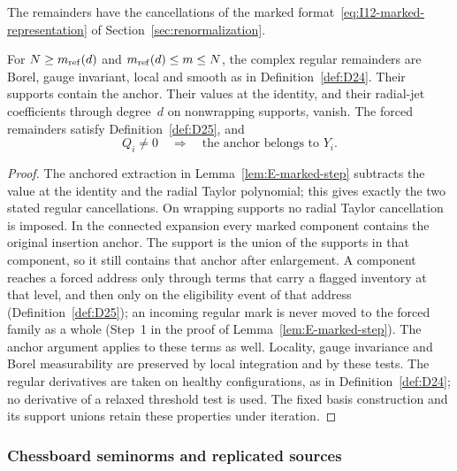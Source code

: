 The remainders have the cancellations of the marked format~\eqref{eq:I12-marked-representation} of Section~\ref{sec:renormalization}.
\begin{lemma}\label{lem:E2.2a}
For $N\ge m_{\mathrm{ref}}(d)$ and $m_{\mathrm{ref}}(d)\le m\le N$, the complex regular remainders are Borel, gauge invariant, local and smooth as in Definition~\ref{def:D24}. Their supports contain the anchor. Their values at the identity, and their radial-jet coefficients through degree~$d$ on nonwrapping supports, vanish. The forced remainders satisfy Definition~\ref{def:D25}, and
\begin{equation*}
Q_i\ne0\quad\Longrightarrow\quad\text{the anchor belongs to }Y_i.
\end{equation*}
\end{lemma}
\begin{proof}
The anchored extraction in Lemma~\ref{lem:E-marked-step} subtracts the value at the identity and the radial Taylor polynomial; this gives exactly the two stated regular cancellations. On wrapping supports no radial Taylor cancellation is imposed. In the connected expansion every marked component contains the original insertion anchor. The support is the union of the supports in that component, so it still contains that anchor after enlargement. A component reaches a forced address only through terms that carry a flagged inventory at that level, and then only on the eligibility event of that address (Definition~\ref{def:D25}); an incoming regular mark is never moved to the forced family as a whole (Step~1 in the proof of Lemma~\ref{lem:E-marked-step}). The anchor argument applies to these terms as well. Locality, gauge invariance and Borel measurability are preserved by local integration and by these tests. The regular derivatives are taken on healthy configurations, as in Definition~\ref{def:D24}; no derivative of a relaxed threshold test is used. The fixed basis construction and its support unions retain these properties under iteration.
\end{proof}

\subsubsection{Chessboard seminorms and replicated sources}\label{sec:partII-E.2.2}

